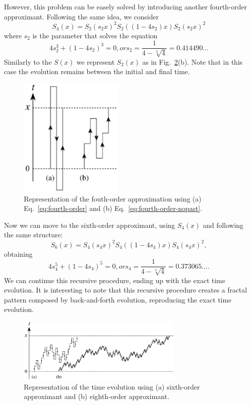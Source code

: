 However, this problem can be easely solved by introducing another fourth-order approximant. Following the same idea, we consider
\begin{equation} \label{eq:fourth-order-nopast}
S_4(x) = S_2(s_2x)^2 S_2((1-4s_2)x) S_2(s_2x)^2	
\end{equation}
where $s_2$ is the parameter that solves the equation
\begin{equation}
4s_2^3 + (1-4s_2)^3 = 0, or s_2 = \frac{1}{4 - \sqrt[3]{4}}=0.414490\ldots
\end{equation}
Similarly to the $S(x)$ we represent $S_2(x)$ as in Fig.~\ref{plot:fractal-evolution}(b). Note that in this case the evolution remains between the initial and final time.
\begin{figure}
   \centering
   \includegraphics[width=5cm]{Plots/evolution.eps}
   \caption{Representation of the fouth-order approximation using (a) Eq.~\eqref{eq:fourth-order} and (b) Eq.~\eqref{eq:fourth-order-nopast}.} \label{plot:evolution}
\end{figure}


Now we can move to the sixth-order approximant, using $S_4(x)$ and following the same structure:
\begin{equation} \label{eq:sixth-order}
S_6(x) = S_4(s_4x)^2 S_4((1-4s_4)x) S_4(s_4x)^2,
\end{equation}
obtaining
\begin{equation}
4s_4^5 + (1-4s_4)^5 = 0, or s_4 = \frac{1}{4-\sqrt[5]{4}} = 0.373065\ldots .
\end{equation}
We can continue this recursive procedure, ending up with the exact time evolution. It is interesting to note that this recursive procedure creates a fractal pattern composed by back-and-forth evolution, reproducing the exact time evolution.
\begin{figure}
  \centering
   \includegraphics[width=8cm]{Plots/fractal_evolution.eps}
   \caption{Representation of the time evolution using (a) sixth-order approximant and (b) eighth-order approximant.} \label{plot:fractal-evolution}
\end{figure}

